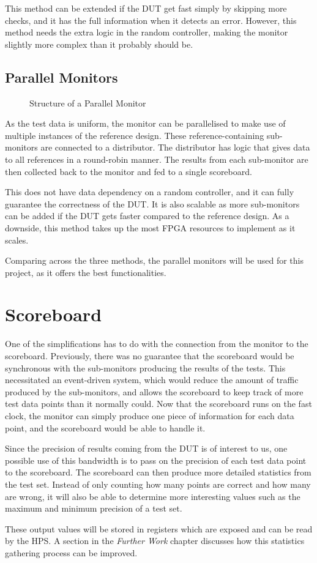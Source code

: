 This method can be extended if the DUT get fast simply by skipping more checks, and it has the full information when it detects an error.
However, this method needs the extra logic in the random controller, making the monitor slightly more complex than it probably should be.

\subsection{Parallel Monitors}

\begin{figure}[H]
  \centering
  
  \caption{Structure of a Parallel Monitor}
  \label{ParMon}
\end{figure}

As the test data is uniform, the monitor can be parallelised to make use of multiple instances of the reference design.
These reference-containing sub-monitors are connected to a distributor.
The distributor has logic that gives data to all references in a round-robin manner.
The results from each sub-monitor are then collected back to the monitor and fed to a single scoreboard.

This does not have data dependency on a random controller, and it can fully guarantee the correctness of the DUT.
It is also scalable as more sub-monitors can be added if the DUT gets faster compared to the reference design.
As a downside, this method takes up the most FPGA resources to implement as it scales.

Comparing across the three methods, the parallel monitors will be used for this project, as it offers the best functionalities.

\section{Scoreboard}
One of the simplifications has to do with the connection from the monitor to the scoreboard.
Previously, there was no guarantee that the scoreboard would be synchronous with the sub-monitors producing the results of the tests.
This necessitated an event-driven system, which would reduce the amount of traffic produced by the sub-monitors, and allows the scoreboard to keep track of more test data points than it normally could.
Now that the scoreboard runs on the fast clock, the monitor can simply produce one piece of information for each data point, and the scoreboard would be able to handle it.

Since the precision of results coming from the DUT is of interest to us, one possible use of this bandwidth is to pass on the precision of each test data point to the scoreboard.
The scoreboard can then produce more detailed statistics from the test set.
Instead of only counting how many points are correct and how many are wrong, it will also be able to determine more interesting values such as the maximum and minimum precision of a test set.

These output values will be stored in registers which are exposed and can be read by the HPS.
A section in the \textit{Further Work} chapter discusses how this statistics gathering process can be improved.
